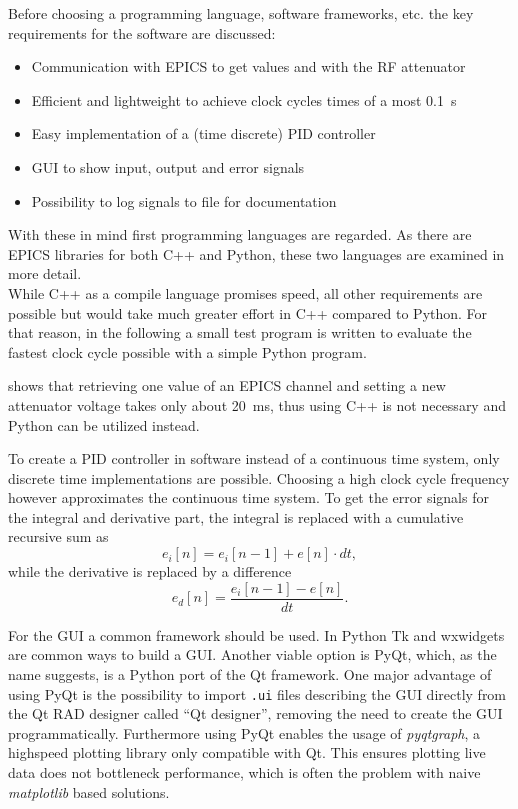 Before choosing a programming language, software frameworks, etc. the key requirements for the software are discussed:
\begin{itemize}
\item Communication with EPICS to get values and with the RF attenuator
\item Efficient and lightweight to achieve clock cycles times of a most \SI{0.1}{\second}
\item Easy implementation of a (time discrete) PID controller
\item GUI to show input, output and error signals
\item Possibility to log signals to file for documentation
\end{itemize}

With these in mind first programming languages are regarded. As there are EPICS libraries for both C++ and Python, these two languages are examined in more detail.\\
While C++ as a compile language promises speed, all other requirements are possible but would take much greater effort in C++ compared to Python. For that reason, in the following a small test program is written to evaluate the fastest clock cycle possible with a simple Python program.

 shows that retrieving one value of an EPICS channel and setting a new attenuator voltage takes only about \SI{20}{\milli\second}, thus using C++ is not necessary and Python can be utilized instead.
 
To create a PID controller in software instead of a continuous time system, only discrete time implementations are possible. Choosing a high clock cycle frequency however approximates the continuous time system. To get the error signals for the integral and derivative part, the integral is replaced with a cumulative recursive sum as
\begin{equation}
e_i[n]=e_i[n-1]+e[n] \cdot dt,
\end{equation}
while the derivative is replaced by a difference
\begin{equation}
e_d[n]=\frac{e_i[n-1]-e[n]}{dt}.
\end{equation}

For the GUI a common framework should be used. In Python Tk and wxwidgets are common ways to build a GUI. Another viable option is PyQt, which, as the name suggests, is a Python port of the Qt framework. One major advantage of using PyQt is the possibility to import \texttt{.ui} files describing the GUI directly from the Qt RAD designer called ``Qt designer'', removing the need to create the GUI programmatically. Furthermore using PyQt enables the usage of \textit{pyqtgraph}, a highspeed plotting library only compatible with Qt. This ensures plotting live data does not bottleneck performance, which is often the problem with naive \textit{matplotlib} based solutions.

